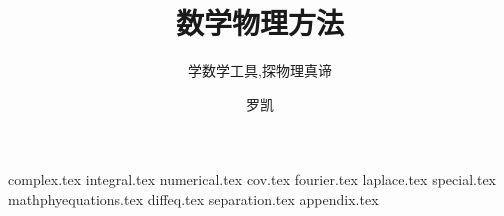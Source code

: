 \documentclass[
  lang=cn,
  10pt,
  mode=simple,
  color=blue, %
  ]{elegantbook}
\title{数学物理方法}
\subtitle{学数学工具,探物理真谛}
\author{罗凯}
\begin{document}
\maketitle
\frontmatter

\tableofcontents

\mainmatter


{complex.tex}
{integral.tex}
{numerical.tex}
{cov.tex}
{fourier.tex}
{laplace.tex}
{special.tex}
{mathphyequations.tex}
{diffeq.tex}
{separation.tex}
{appendix.tex}



\nocite{*}
\printbibliography[heading=bibintoc, title=\ebibname]
\end{document}
